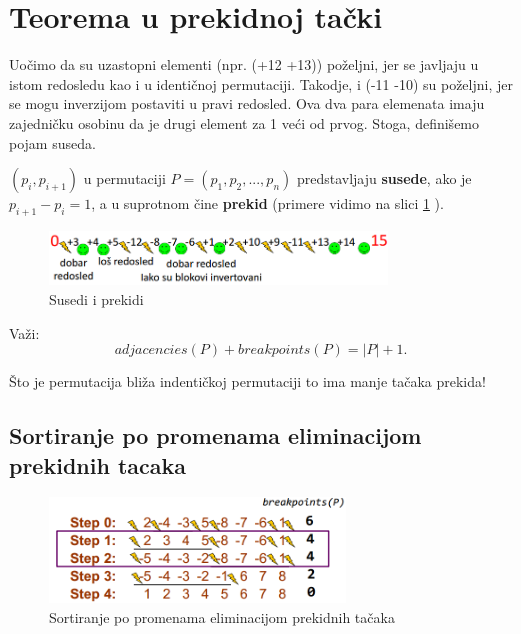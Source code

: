 \begin{minipage}{\textwidth}
\begin{minipage}{0.4\textwidth}
	\end{minipage}
	\vspace*{1em}
\end{minipage}


\section{Teorema u prekidnoj tački}

Uočimo da su uzastopni elementi (npr. (+12 +13)) poželjni, jer se javljaju u istom redosledu kao i u identičnoj permutaciji. Takodje, i (-11 -10) su poželjni, jer se mogu inverzijom postaviti u pravi redosled. Ova dva para elemenata imaju zajedničku osobinu da je drugi element za 1 veći od prvog. Stoga, definišemo pojam suseda.

\begin{definicija}{$(p_i, p_{i+1})$ u permutaciji $P = (p_1, p_2, ..., p_n)$ predstavljaju \textbf{susede}, ako je $p_{i+1} - p_i = 1$, a u suprotnom čine \textbf{prekid} (primere vidimo na slici  \ref{slika:susedi} )}.
\end{definicija}

\begin{figure}[h!]
\centering
\includegraphics[width=0.8\textwidth]{poglavlja/6/slike/dobar_los.PNG}
\caption{Susedi i prekidi}
\label{slika:susedi}
\end{figure}

Važi:\\
$$ adjacencies(P) + breakpoints(P) = |P| + 1.$$

Što je permutacija bliža indentičkoj permutaciji to ima manje tačaka prekida!

\subsection{Sortiranje po promenama eliminacijom prekidnih tacaka}


\begin{figure}[h]
\centering
\includegraphics[width=0.7\textwidth]{poglavlja/6/slike/koliko.PNG}
\caption{Sortiranje po promenama eliminacijom prekidnih tačaka}
\label{slika:sortiranje}
\end{figure}

